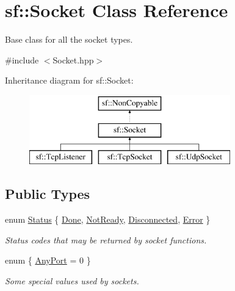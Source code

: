 \hypertarget{classsf_1_1Socket}{\section{sf\-:\-:Socket Class Reference}
\label{classsf_1_1Socket}
}


Base class for all the socket types.  




{\ttfamily \#include $<$Socket.\-hpp$>$}

Inheritance diagram for sf\-:\-:Socket\-:\begin{figure}[H]
\begin{center}
\leavevmode
\includegraphics[height=3.000000cm]{classsf_1_1Socket}
\end{center}
\end{figure}
\subsection*{Public Types}
\begin{DoxyCompactItemize}
\item 
enum \hyperlink{classsf_1_1Socket_a51bf0fd51057b98a10fbb866246176dc}{Status} \{ \hyperlink{classsf_1_1Socket_a51bf0fd51057b98a10fbb866246176dca1de3a85bc56d3ae85b3d0f3cfd04ae90}{Done}, 
\hyperlink{classsf_1_1Socket_a51bf0fd51057b98a10fbb866246176dca8554848daae98f996e131bdeed076c09}{Not\-Ready}, 
\hyperlink{classsf_1_1Socket_a51bf0fd51057b98a10fbb866246176dcab215141f756acdc23c67fad149710eb1}{Disconnected}, 
\hyperlink{classsf_1_1Socket_a51bf0fd51057b98a10fbb866246176dca1dc9854433a28c22e192721179a2df5d}{Error}
 \}
\begin{DoxyCompactList}\small\item\em Status codes that may be returned by socket functions. \end{DoxyCompactList}\item 
enum \{ \hyperlink{classsf_1_1Socket_a5deb2c955fd347259c3a20d27b2481aaa5a3c30fd128895403afc11076f461b19}{Any\-Port} = 0
 \}
\begin{DoxyCompactList}\small\item\em Some special values used by sockets. \end{DoxyCompactList}\end{DoxyCompactItemize}
